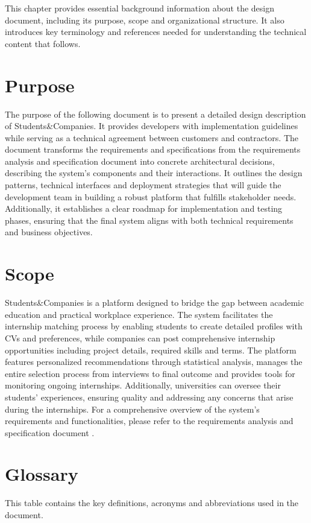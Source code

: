 This chapter provides essential background information about the design document, including its purpose, scope and organizational structure.
It also introduces key terminology and references needed for understanding the technical content that follows.

\section{Purpose}
The purpose of the following document is to present a detailed design description of Students\&Companies.
It provides developers with implementation guidelines while serving as a technical agreement between customers and contractors.
The document transforms the requirements and specifications from the requirements analysis and specification document \cite{carraracurrodossi2024} into concrete architectural decisions, describing the system's components and their interactions.
It outlines the design patterns, technical interfaces and deployment strategies that will guide the development team in building a robust platform that fulfills stakeholder needs.
Additionally, it establishes a clear roadmap for implementation and testing phases, ensuring that the final system aligns with both technical requirements and business objectives.

\section{Scope}
Students\&Companies is a platform designed to bridge the gap between academic education and practical workplace experience.
The system facilitates the internship matching process by enabling students to create detailed profiles with CVs and preferences, while companies can post comprehensive internship opportunities including project details, required skills and terms.
The platform features personalized recommendations through statistical analysis, manages the entire selection process from interviews to final outcome and provides tools for monitoring ongoing internships.
Additionally, universities can oversee their students' experiences, ensuring quality and addressing any concerns that arise during the internships.
For a comprehensive overview of the system's requirements and functionalities, please refer to the requirements analysis and specification document \cite{carraracurrodossi2024}.

\section{Glossary}
This table contains the key definitions, acronyms and abbreviations used in the document.

